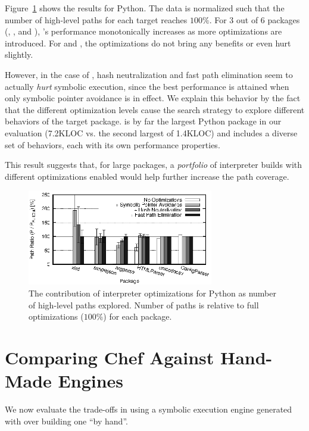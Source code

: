 Figure~\ref{fig:optimizations} shows the results for Python.  The data is normalized such that the number of high-level paths for each target reaches $100\%$.  For 3 out of 6 packages (, , and ), \chef's performance monotonically increases as more optimizations are introduced.  For  and , the optimizations do not bring any benefits or even hurt slightly.  

However, in the case of , hash neutralization and fast path elimination seem to actually \emph{hurt} symbolic execution, since the best performance is attained when only symbolic pointer avoidance is in effect.  We explain this behavior by the fact that the different optimization levels cause the search strategy to explore different behaviors of the target package.   is by far the largest Python package in our evaluation (7.2KLOC vs. the second largest of 1.4KLOC) and includes a diverse set of behaviors, each with its own performance properties.

This result suggests that, for large packages, a \emph{portfolio} of interpreter builds with different optimizations enabled would help further increase the path coverage.

\begin{figure}
  \centering
  \includegraphics[width=3.2in]{figures/evaluation/optimizations-bars-python}
  \caption{The contribution of interpreter optimizations for Python as number of high-level paths explored.  Number of paths is relative to full optimizations ($100\%$) for each package.}
  \label{fig:optimizations}
\end{figure}


\section{Comparing Chef Against Hand-Made Engines}
\label{sec:sub:comparison}

We now evaluate the trade-offs in using a symbolic execution engine generated with \chef over building one ``by hand''.

